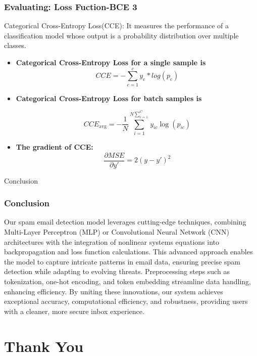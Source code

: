 \documentclass[aspectratio=1610]{beamer}
\begin{document}
\begin{frame}
    \frametitle{Evaluating: Loss Fuction-BCE 3}
    Categorical Cross-Entropy Loss(CCE): It measures the performance of a classification 
    model whose output is a probability distribution over multiple classes. 
    \vspace{0.5cm}

    \begin{itemize}

        \item  \textbf{Categorical Cross-Entropy Loss for a single sample is} 
        \[
            CCE = - \sum_{c=1}^{c} y_\text{c} * log(p_\text{c})
        \]

        \item \textbf{Categorical Cross-Entropy Loss for batch samples is }
        
\[
CCE_{\text{avg}} = - \frac{1}{N} \sum_{i=1}^{N\sum_{c=1}^{C}}  y_{ic} \log(p_{ic})
\]
        
        \item \textbf{The gradient of CCE:}
       \[
       \frac{\partial MSE}{\partial y'} =  2(y-y')^2
       \]
    \end{itemize}


\end{frame}




\begin{frame}{Conclusion}
    \frametitle{Conclusion}
    Our spam email detection model leverages cutting-edge techniques, 
    combining Multi-Layer Perceptron (MLP) or 
    Convolutional Neural Network (CNN) 
    architectures with the integration of nonlinear systems equations into backpropagation 
    and loss function calculations. This advanced approach enables the model to capture intricate patterns in email data, ensuring precise spam detection while adapting to evolving threats. Preprocessing steps such as tokenization, one-hot encoding, and token embedding streamline data handling, enhancing efficiency. By uniting these innovations, our system achieves exceptional accuracy, computational efficiency, and robustness, providing users with a cleaner, more secure inbox experience.
    
\end{frame}

\section{Thank You}
\end{document}
